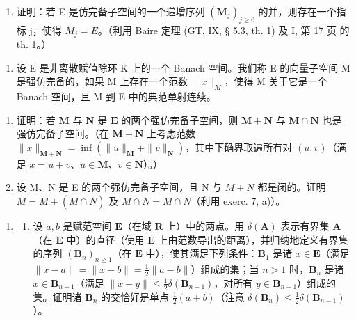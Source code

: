 \begin{enumerate}
\def\labelenumi{\alph{enumi})}
\setcounter{enumi}{1}
\tightlist
\item
  证明：若 E 是仿完备子空间的一个递增序列 \((\mathbf{M}_{j})_{j\geq0}\) 的并，则存在一个指标 j，使得 \(M_{j}=E\)。（利用 Baire 定理 (GT, IX, § 5.3, th. 1) 及 I, 第 17 页 的 th. 1。）
\end{enumerate}

\begin{enumerate}
\def\labelenumi{\arabic{enumi})}
\setcounter{enumi}{7}
\tightlist
\item
  设 E 是非离散赋值除环 K 上的一个 Banach 空间。我们称 E 的向量子空间 M 是强仿完备的，如果 M 上存在一个范数 \(\|x\|_{M}\)，使得 M 关于它是一个 Banach 空间，且 M 到 E 中的典范单射连续。
\end{enumerate}

\begin{enumerate}
\def\labelenumi{\alph{enumi})}
\item
  证明：若 \(\mathbf{M}\) 与 \(\mathbf{N}\) 是 \(\mathbf{E}\) 的两个强仿完备子空间，则 \(\mathbf{M} + \mathbf{N}\) 与 \(\mathbf{M} \cap \mathbf{N}\) 也是强仿完备子空间。（在 \(\mathbf{M} + \mathbf{N}\) 上考虑范数 \(\|x\|_{\mathbf{M} + \mathbf{N}} = \inf (\|u\|_{\mathbf{M}} + \|v\|_{\mathbf{N}})\)，其中下确界取遍所有对 \((u, v)\)（满足 \(x = u + v\)、\(u \in \mathbf{M}\)、\(v \in \mathbf{N}\)）。）
\item
  设 M、N 是 E 的两个强仿完备子空间，且 N 与 \(M + N\) 都是闭的。证明 \(\overline{M} = M + (\overline{M} \cap \overline{N})\) 及 \(\overline{M} \cap \overline{N} = \overline{M} \cap N\)（利用 exerc. 7, a)）。
\end{enumerate}

\begin{enumerate}
\def\labelenumi{\arabic{enumi})}
\setcounter{enumi}{8}
\tightlist
\item
  \begin{enumerate}
  \def\labelenumii{\alph{enumii})}
  \tightlist
  \item
    设 \(a, b\) 是赋范空间 \(\mathbf{E}\)（在域 \(\mathbf{R}\) 上）中的两点。用 \(\delta(\mathbf{A})\) 表示有界集 \(\mathbf{A}\)（在 \(\mathbf{E}\) 中）的直径（使用 \(\mathbf{E}\) 上由范数导出的距离），并归纳地定义有界集的序列 \((\mathbf{B}_n)_{n \geqslant 1}\)（在 \(\mathbf{E}\) 中），使其满足下列条件：\(\mathbf{B}_1\) 是诸 \(x \in \mathbf{E}\)（满足 \(\|x - a\| = \|x - b\| = \frac{1}{2}\|a - b\|\)）组成的集；当 \(n > 1\) 时，\(\mathbf{B}_n\) 是诸 \(x \in \mathbf{B}_{n-1}\)（满足 \(\|x - y\| \leqslant \frac{1}{2}\delta(\mathbf{B}_{n-1})\)，对所有 \(y \in \mathbf{B}_{n-1}\)）组成的集。证明诸 \(\mathbf{B}_n\) 的交恰好是单点 \(\frac{1}{2}(a + b)\)（注意 \(\delta(\mathbf{B}_n) \leqslant \frac{1}{2}\delta(\mathbf{B}_{n-1})\)）。
  \end{enumerate}
\end{enumerate}

